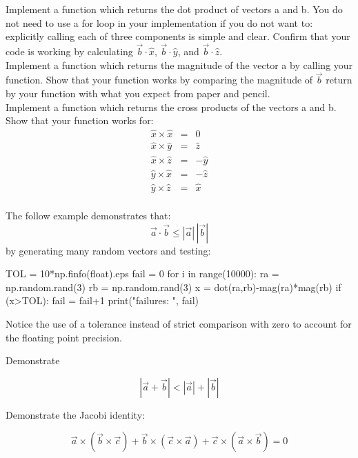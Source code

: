 \vskip 0.25cm
\plot Implement a function  which returns the dot product of vectors a and b.  You do not need to use a for loop in your implementation if you do not want to: explicitly calling each of three components is simple and clear.  Confirm that your code is working by calculating $\vec{b}\cdot\hat{x}$, $\vec{b}\cdot\hat{y}$, and $\vec{b}\cdot\hat{z}$. \\


\plot Implement a function  which returns the magnitude of the vector a by calling your  function.  Show that your function works by comparing the magnitude of $\vec{b}$ return by your function with what you expect from paper and pencil.\\

\plot Implement a function  which returns the cross products of the vectors a and b.  Show that your function works for:
\begin{eqnarray*}
  \hat{x} \times \hat{x} &=& 0\\    
  \hat{x} \times \hat{y} &=& \hat{z}\\
  \hat{x} \times \hat{z} &=& -\hat{y}\\
  \hat{y} \times \hat{x} &=& -\hat{z}\\
  \hat{y} \times \hat{z} &=& \hat{x} \\ 
\end{eqnarray*}


The follow example demonstrates that:
\begin{displaymath}
\vec{a} \cdot \vec{b} \leq |\vec{a}|\,|\vec{b}|
\end{displaymath}
by generating many random vectors and testing:
\begin{python}
TOL = 10*np.finfo(float).eps
fail = 0
for i in range(10000):
    ra = np.random.rand(3)
    rb = np.random.rand(3)
    x = dot(ra,rb)-mag(ra)*mag(rb)
    if (x>TOL):
        fail = fail+1
print("failures:  ", fail)
\end{python}
Notice the use of a tolerance instead of strict comparison with zero
to account for the floating point precision.\\

\begin{plot} Demonstrate\end{plot}
\begin{displaymath}
  |\vec{a} + \vec{b}| < |\vec{a}| + |\vec{b}|
\end{displaymath}

\vskip 0.25cm
\begin{plot} Demonstrate the Jacobi identity:\end{plot}
\begin{displaymath}
 \vec{a} \times (\vec{b} \times \vec{c}) + \vec{b} \times (\vec{c} \times \vec{a}) + \vec{c} \times (\vec{a} \times \vec{b}) = 0
\end{displaymath}

